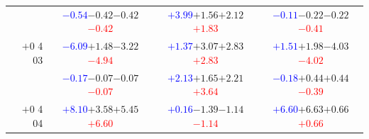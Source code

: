 \documentclass[compress]{beamer}
\begin{document}
\begin{frame}
\begin{tabular}{r | c | c | c}
          & \textcolor{blue}{$-0.54$}\hspace{0.1 cm}$-0.42$\hspace{0.1 cm}$-0.42$\hspace{0.1 cm}\textcolor{red}{$-0.42$} & \textcolor{blue}{$+3.99$}\hspace{0.1 cm}$+1.56$\hspace{0.1 cm}$+2.12$\hspace{0.1 cm}\textcolor{red}{$+1.83$} & \textcolor{blue}{$-0.11$}\hspace{0.1 cm}$-0.22$\hspace{0.1 cm}$-0.22$\hspace{0.1 cm}\textcolor{red}{$-0.41$} \\
$+$0 4 03 & \textcolor{blue}{$-6.09$}\hspace{0.1 cm}$+1.48$\hspace{0.1 cm}$-3.22$\hspace{0.1 cm}\textcolor{red}{$-4.94$} & \textcolor{blue}{$+1.37$}\hspace{0.1 cm}$+3.07$\hspace{0.1 cm}$+2.83$\hspace{0.1 cm}\textcolor{red}{$+2.83$} & \textcolor{blue}{$+1.51$}\hspace{0.1 cm}$+1.98$\hspace{0.1 cm}$-4.03$\hspace{0.1 cm}\textcolor{red}{$-4.02$} \\
          & \textcolor{blue}{$-0.17$}\hspace{0.1 cm}$-0.07$\hspace{0.1 cm}$-0.07$\hspace{0.1 cm}\textcolor{red}{$-0.07$} & \textcolor{blue}{$+2.13$}\hspace{0.1 cm}$+1.65$\hspace{0.1 cm}$+2.21$\hspace{0.1 cm}\textcolor{red}{$+3.64$} & \textcolor{blue}{$-0.18$}\hspace{0.1 cm}$+0.44$\hspace{0.1 cm}$+0.44$\hspace{0.1 cm}\textcolor{red}{$-0.39$} \\
$+$0 4 04 & \textcolor{blue}{$+8.10$}\hspace{0.1 cm}$+3.58$\hspace{0.1 cm}$+5.45$\hspace{0.1 cm}\textcolor{red}{$+6.60$} & \textcolor{blue}{$+0.16$}\hspace{0.1 cm}$-1.39$\hspace{0.1 cm}$-1.14$\hspace{0.1 cm}\textcolor{red}{$-1.14$} & \textcolor{blue}{$+6.60$}\hspace{0.1 cm}$+6.63$\hspace{0.1 cm}$+0.66$\hspace{0.1 cm}\textcolor{red}{$+0.66$} \\

\end{tabular}
\end{frame}
\end{document}
